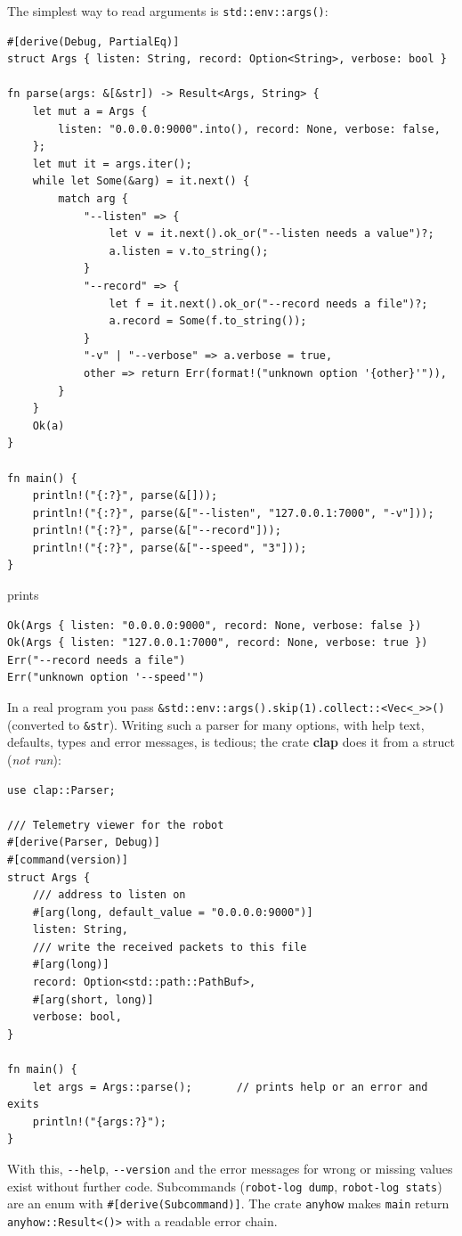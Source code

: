The simplest way to read arguments is \verb!std::env::args()!:
\begin{verbatim}
#[derive(Debug, PartialEq)]
struct Args { listen: String, record: Option<String>, verbose: bool }

fn parse(args: &[&str]) -> Result<Args, String> {
    let mut a = Args {
        listen: "0.0.0.0:9000".into(), record: None, verbose: false,
    };
    let mut it = args.iter();
    while let Some(&arg) = it.next() {
        match arg {
            "--listen" => {
                let v = it.next().ok_or("--listen needs a value")?;
                a.listen = v.to_string();
            }
            "--record" => {
                let f = it.next().ok_or("--record needs a file")?;
                a.record = Some(f.to_string());
            }
            "-v" | "--verbose" => a.verbose = true,
            other => return Err(format!("unknown option '{other}'")),
        }
    }
    Ok(a)
}

fn main() {
    println!("{:?}", parse(&[]));
    println!("{:?}", parse(&["--listen", "127.0.0.1:7000", "-v"]));
    println!("{:?}", parse(&["--record"]));
    println!("{:?}", parse(&["--speed", "3"]));
}
\end{verbatim}
prints
\begin{verbatim}
Ok(Args { listen: "0.0.0.0:9000", record: None, verbose: false })
Ok(Args { listen: "127.0.0.1:7000", record: None, verbose: true })
Err("--record needs a file")
Err("unknown option '--speed'")
\end{verbatim}
In a real program you pass \verb!&std::env::args().skip(1).collect::<Vec<_>>()! (converted to \verb!&str!). Writing such a parser for many options, with help text, defaults, types and error messages, is tedious; the crate \textbf{clap} does it from a struct (\emph{not run}):
\begin{verbatim}
use clap::Parser;

/// Telemetry viewer for the robot
#[derive(Parser, Debug)]
#[command(version)]
struct Args {
    /// address to listen on
    #[arg(long, default_value = "0.0.0.0:9000")]
    listen: String,
    /// write the received packets to this file
    #[arg(long)]
    record: Option<std::path::PathBuf>,
    #[arg(short, long)]
    verbose: bool,
}

fn main() {
    let args = Args::parse();       // prints help or an error and exits
    println!("{args:?}");
}
\end{verbatim}
With this, \verb!--help!, \verb!--version! and the error messages for wrong or missing values exist without further code. Subcommands (\verb!robot-log dump!, \verb!robot-log stats!) are an enum with \verb!#[derive(Subcommand)]!. The crate \verb!anyhow! makes \verb!main! return \verb!anyhow::Result<()>! with a readable error chain.

